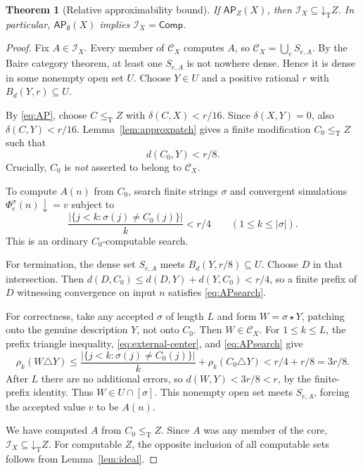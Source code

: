 \documentclass[11pt,a4paper]{article}
\newcommand{\leT}{\leq_{\mathrm T}}
\newcommand{\CD}{\mathcal C}
\newcommand{\core}{\mathcal I}
\newcommand{\Comp}{\mathsf{Comp}}
\newcommand{\low}[1]{\mathord\downarrow_{\!\mathrm T}#1}
\newcommand{\AP}{\mathsf{AP}}
\newcommand{\patch}{\mathbin\star}
\newtheorem{theorem}{Theorem}[section]
\theoremstyle{definition}\newtheorem{definition}[theorem]{Definition}
\theoremstyle{remark}\newtheorem{remark}[theorem]{Remark}
\begin{document}
\begin{theorem}[Relative approximability bound]\label{thm:APcore}
If $\AP_Z(X)$, then $\core_X\subseteq\low Z$. In particular,
$\AP_{\emptyset}(X)$ implies $\core_X=\Comp$.
\end{theorem}
\begin{proof}
Fix $A\in\core_X$. Every member of $\CD_X$ computes $A$, so
$\CD_X=\bigcup_e S_{e,A}$. By the Baire category theorem, at least one $S_{e,A}$
is not nowhere dense. Hence it is dense in some nonempty open set $U$.
Choose $Y\in U$ and a positive rational $r$ with $B_d(Y,r)\subseteq U$.

By \eqref{eq:AP}, choose $C\leT Z$ with $\delta(C,X)<r/16$. Since
$\delta(X,Y)=0$, also $\delta(C,Y)<r/16$. Lemma~\ref{lem:approxpatch} gives
a finite modification $C_0\leT Z$ such that
\begin{equation}\label{eq:external-center}
 d(C_0,Y)<r/8.
\end{equation}
Crucially, $C_0$ is \emph{not} asserted to belong to $\CD_X$.

To compute $A(n)$ from $C_0$, search finite strings $\sigma$ and convergent
simulations $\Phi_e^\sigma(n)\downarrow=v$ subject to
\begin{equation}\label{eq:APsearch}
 \frac{|\{j<k:\sigma(j)\ne C_0(j)\}|}{k}<r/4
 \qquad(1\le k\le|\sigma|).
\end{equation}
This is an ordinary $C_0$-computable search.

For termination, the dense set $S_{e,A}$ meets $B_d(Y,r/8)\subseteq U$.
Choose $D$ in that intersection. Then
$d(D,C_0)\le d(D,Y)+d(Y,C_0)<r/4$, so a finite prefix of $D$ witnessing
convergence on input $n$ satisfies \eqref{eq:APsearch}.

For correctness, take any accepted $\sigma$ of length $L$ and form
$W=\sigma\patch Y$, patching onto the genuine description $Y$, not onto
$C_0$. Then $W\in\CD_X$. For $1\le k\le L$, the prefix triangle inequality,
\eqref{eq:external-center}, and \eqref{eq:APsearch} give
\[
 \rho_k(W\triangle Y)
 \le \frac{|\{j<k:\sigma(j)\ne C_0(j)\}|}{k}
       +\rho_k(C_0\triangle Y)
 <r/4+r/8=3r/8.
\]
After $L$ there are no additional errors, so
$d(W,Y)<3r/8<r$, by the finite-prefix identity. Thus
$W\in U\cap[\sigma]$. This nonempty open set meets $S_{e,A}$, forcing the
accepted value $v$ to be $A(n)$.

We have computed $A$ from $C_0\leT Z$. Since $A$ was any member of the core,
$\core_X\subseteq\low Z$. For computable $Z$, the opposite inclusion of all
computable sets follows from Lemma~\ref{lem:ideal}.
\end{proof}
\end{document}
